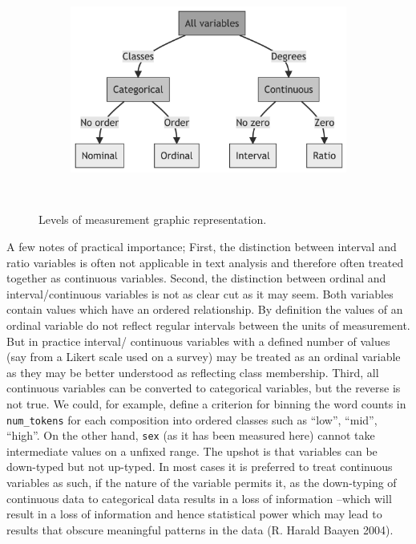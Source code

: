 \documentclass[
  letterpaper,
]{latex/krantz}
\begin{document}
\begin{figure}

{\centering 

\begin{figure}[H]

{\centering \includegraphics[width=4.68in,height=2.8in]{approaching-analysis_files/figure-latex/mermaid-figure-1.png}

}

\end{figure}

}

\caption{\label{fig-intro-values}Levels of measurement graphic
representation.}

\end{figure}

A few notes of practical importance; First, the distinction between
interval and ratio variables is often not applicable in text analysis
and therefore often treated together as continuous variables. Second,
the distinction between ordinal and interval/continuous variables is not
as clear cut as it may seem. Both variables contain values which have an
ordered relationship. By definition the values of an ordinal variable do
not reflect regular intervals between the units of measurement. But in
practice interval/ continuous variables with a defined number of values
(say from a Likert scale used on a survey) may be treated as an ordinal
variable as they may be better understood as reflecting class
membership. Third, all continuous variables can be converted to
categorical variables, but the reverse is not true. We could, for
example, define a criterion for binning the word counts in
\texttt{num\_tokens} for each composition into ordered classes such as
``low'', ``mid'', ``high''. On the other hand, \texttt{sex} (as it has
been measured here) cannot take intermediate values on a unfixed range.
The upshot is that variables can be down-typed but not up-typed. In most
cases it is preferred to treat continuous variables as such, if the
nature of the variable permits it, as the down-typing of continuous data
to categorical data results in a loss of information --which will result
in a loss of information and hence statistical power which may lead to
results that obscure meaningful patterns in the data (R. Harald Baayen
2004).
\end{document}
